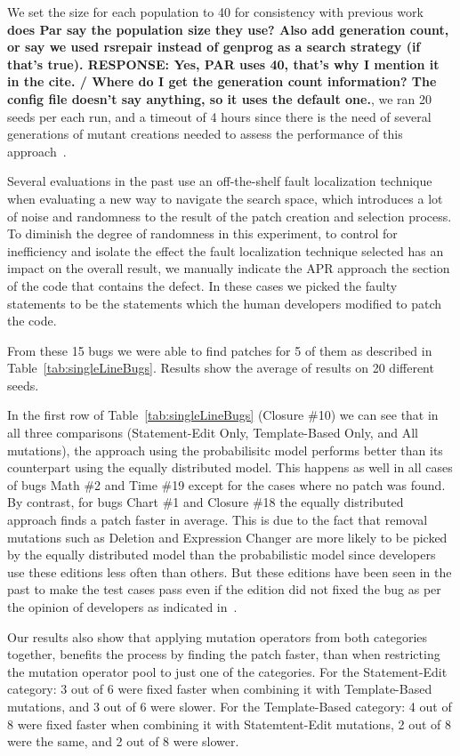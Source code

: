 \documentclass[conference]{IEEEtran}
\newcommand{\todo}[1]
  {{\scriptsize \textbf{\color{red} {#1}}}}
\begin{document}
We set the size for each population to 40 for consistency with 
previous work~\cite{legoues12,kim2013}\todo{does Par say the population size
  they use? Also add generation count, or say we used rsrepair instead of
  genprog as a search strategy (if that's true).  RESPONSE: Yes, PAR uses 40, that's why I mention it in the cite. / Where do I get the generation count information? The config file doesn't say anything, so it uses the default one.}, we ran 20 seeds per each run, and a timeout of 4 hours since there is 
the need of several generations of mutant creations needed to assess the 
performance of this approach~\cite{arcuri11}.



Several evaluations in the past use an off-the-shelf fault localization
technique when evaluating a new way to navigate the search space, which
introduces a lot of noise and randomness to the result of the patch creation and
selection process. To diminish the degree of randomness in this experiment, to
  control for inefficiency and isolate the effect the fault localization technique selected has an impact on the overall result, we manually
 indicate the APR approach the section of the code that contains
the defect. In these cases we picked the faulty statements to be the statements
which the human developers modified to patch the code. 

From these 15 bugs we were able to find patches for 5 of them as described in
Table~\ref{tab:singleLineBugs}. Results show the average of results on 
20 different seeds.  

In the first row of Table~\ref{tab:singleLineBugs} (Closure \#10) we can see
that in all three comparisons (Statement-Edit Only, Template-Based Only, and All
mutations), the approach using the probabilisitc model performs better than its
counterpart using the equally distributed model. This happens as well in all
cases of bugs Math \#2 and Time \#19 except for the cases where no patch was
found. By contrast, for bugs Chart \#1 and Closure \#18 the equally
distributed approach finds a patch faster in average. This is due to the fact
that removal mutations such as Deletion and Expression Changer are more likely
to be picked by the equally distributed model than the probabilistic model since
developers use these editions less often than others. But these editions have
been seen in the past to make the test cases pass even if the edition did not
fixed the bug as per the opinion of developers as indicated in~\cite{kim2013}. 

Our results also show that applying mutation operators from both categories
together, benefits the process by finding the patch faster, than when
restricting the mutation operator pool to just one of the categories. For the
Statement-Edit category: 3 out of 6 were fixed faster when combining it with
Template-Based mutations, and 3 out of 6 were slower. For the Template-Based
category: 4 out of 8 were fixed faster when combining it with Statemtent-Edit
mutations, 2 out of 8 were the same, and 2 out of 8 were slower. 
\end{document}
